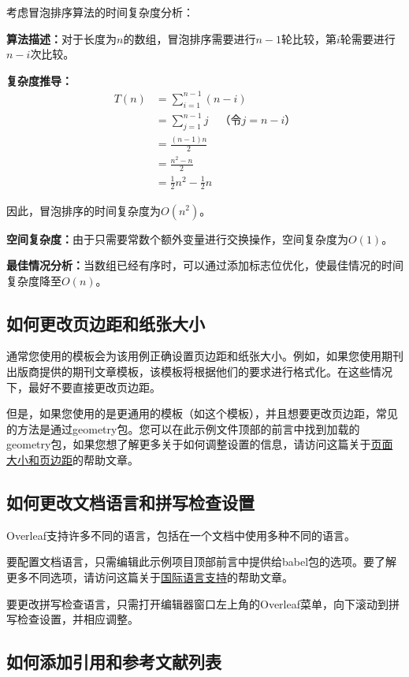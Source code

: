 \documentclass{article}
\begin{document}
考虑冒泡排序算法的时间复杂度分析：

\textbf{算法描述：}对于长度为$n$的数组，冒泡排序需要进行$n-1$轮比较，第$i$轮需要进行$n-i$次比较。

\textbf{复杂度推导：}
\begin{align}
T(n) &= \sum_{i=1}^{n-1} (n-i) \\
&= \sum_{j=1}^{n-1} j \quad \text{（令$j = n-i$）} \\
&= \frac{(n-1)n}{2} \\
&= \frac{n^2 - n}{2} \\
&= \frac{1}{2}n^2 - \frac{1}{2}n
\end{align}

因此，冒泡排序的时间复杂度为$O(n^2)$。

\textbf{空间复杂度：}由于只需要常数个额外变量进行交换操作，空间复杂度为$O(1)$。

\textbf{最佳情况分析：}当数组已经有序时，可以通过添加标志位优化，使最佳情况的时间复杂度降至$O(n)$。


\subsection{如何更改页边距和纸张大小}

通常您使用的模板会为该用例正确设置页边距和纸张大小。例如，如果您使用期刊出版商提供的期刊文章模板，该模板将根据他们的要求进行格式化。在这些情况下，最好不要直接更改页边距。

但是，如果您使用的是更通用的模板（如这个模板），并且想要更改页边距，常见的方法是通过geometry包。您可以在此示例文件顶部的前言中找到加载的geometry包，如果您想了解更多关于如何调整设置的信息，请访问这篇关于\href{https://www.overleaf.com/learn/latex/page_size_and_margins}{页面大小和页边距}的帮助文章。

\subsection{如何更改文档语言和拼写检查设置}

Overleaf支持许多不同的语言，包括在一个文档中使用多种不同的语言。

要配置文档语言，只需编辑此示例项目顶部前言中提供给babel包的选项。要了解更多不同选项，请访问这篇关于\href{https://www.overleaf.com/learn/latex/International_language_support}{国际语言支持}的帮助文章。

要更改拼写检查语言，只需打开编辑器窗口左上角的Overleaf菜单，向下滚动到拼写检查设置，并相应调整。

\subsection{如何添加引用和参考文献列表}
\end{document}
